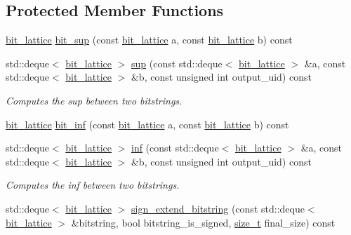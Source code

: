 \subsection*{Protected Member Functions}
\begin{DoxyCompactItemize}
\item 
\hyperlink{bit__lattice_8hpp_ab732360111c810c4eaeb4c8b81d160d6}{bit\+\_\+lattice} \hyperlink{classBitLatticeManipulator_adeb8cad98cb703dfa33e6d0170edf096}{bit\+\_\+sup} (const \hyperlink{bit__lattice_8hpp_ab732360111c810c4eaeb4c8b81d160d6}{bit\+\_\+lattice} a, const \hyperlink{bit__lattice_8hpp_ab732360111c810c4eaeb4c8b81d160d6}{bit\+\_\+lattice} b) const
\item 
std\+::deque$<$ \hyperlink{bit__lattice_8hpp_ab732360111c810c4eaeb4c8b81d160d6}{bit\+\_\+lattice} $>$ \hyperlink{classBitLatticeManipulator_a83eec7b71ec09cf4f2102efaaef3a1ad}{sup} (const std\+::deque$<$ \hyperlink{bit__lattice_8hpp_ab732360111c810c4eaeb4c8b81d160d6}{bit\+\_\+lattice} $>$ \&a, const std\+::deque$<$ \hyperlink{bit__lattice_8hpp_ab732360111c810c4eaeb4c8b81d160d6}{bit\+\_\+lattice} $>$ \&b, const unsigned int output\+\_\+uid) const
\begin{DoxyCompactList}\small\item\em Computes the sup between two bitstrings. \end{DoxyCompactList}\item 
\hyperlink{bit__lattice_8hpp_ab732360111c810c4eaeb4c8b81d160d6}{bit\+\_\+lattice} \hyperlink{classBitLatticeManipulator_a75559217d7d2d6f397b3252e8234898b}{bit\+\_\+inf} (const \hyperlink{bit__lattice_8hpp_ab732360111c810c4eaeb4c8b81d160d6}{bit\+\_\+lattice} a, const \hyperlink{bit__lattice_8hpp_ab732360111c810c4eaeb4c8b81d160d6}{bit\+\_\+lattice} b) const
\item 
std\+::deque$<$ \hyperlink{bit__lattice_8hpp_ab732360111c810c4eaeb4c8b81d160d6}{bit\+\_\+lattice} $>$ \hyperlink{classBitLatticeManipulator_ae7c7d4aab6d19114196a9dc8cea6a32c}{inf} (const std\+::deque$<$ \hyperlink{bit__lattice_8hpp_ab732360111c810c4eaeb4c8b81d160d6}{bit\+\_\+lattice} $>$ \&a, const std\+::deque$<$ \hyperlink{bit__lattice_8hpp_ab732360111c810c4eaeb4c8b81d160d6}{bit\+\_\+lattice} $>$ \&b, const unsigned int output\+\_\+uid) const
\begin{DoxyCompactList}\small\item\em Computes the inf between two bitstrings. \end{DoxyCompactList}\item 
std\+::deque$<$ \hyperlink{bit__lattice_8hpp_ab732360111c810c4eaeb4c8b81d160d6}{bit\+\_\+lattice} $>$ \hyperlink{classBitLatticeManipulator_a4f374ceca7857bb7bc52a31f3f9872f9}{sign\+\_\+extend\+\_\+bitstring} (const std\+::deque$<$ \hyperlink{bit__lattice_8hpp_ab732360111c810c4eaeb4c8b81d160d6}{bit\+\_\+lattice} $>$ \&bitstring, bool bitstring\+\_\+is\+\_\+signed, \hyperlink{tutorial__fpt__2017_2intro_2sixth_2test_8c_a7c94ea6f8948649f8d181ae55911eeaf}{size\+\_\+t} final\+\_\+size) const

\end{DoxyCompactItemize}
